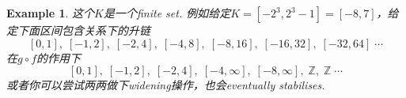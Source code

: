 \documentclass{article}
\newtheorem{example}[theorem]{Example}
\begin{document}
\begin{example}
这个$K$是一个finite set. 例如给定$K = [-2^3, 2^3-1] = [-8,7]$，给定下面区间包含关系下的升链
$$
[0, 1],\;[-1,2],\;[-2,4],\;[-4,8],\;[-8,16],\;[-16,32],\;[-32,64]\;\cdots
$$
在$g \circ f$的作用下
$$
[0, 1],\;[-1,2],\;[-2,4],\;[-4,\infty],\;[-8,\infty],\;\mathbb{Z},\;\mathbb{Z}\;\cdots
$$
或者你可以尝试两两做下widening操作，也会eventually stabilises.
\end{example}
\end{document}
